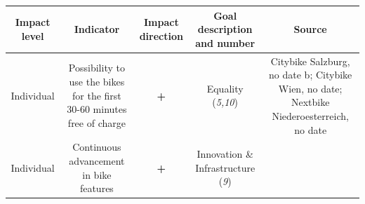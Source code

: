\documentclass[
]{book}
\begin{document}
\begin{longtable}[]{@{}ccccc@{}}
\toprule
\begin{minipage}[b]{0.17\columnwidth}\centering
Impact level\strut
\end{minipage} & \begin{minipage}[b]{0.16\columnwidth}\centering
Indicator\strut
\end{minipage} & \begin{minipage}[b]{0.17\columnwidth}\centering
Impact direction\strut
\end{minipage} & \begin{minipage}[b]{0.17\columnwidth}\centering
Goal description and number\strut
\end{minipage} & \begin{minipage}[b]{0.17\columnwidth}\centering
Source\strut
\end{minipage}\tabularnewline
\midrule
\endhead
\begin{minipage}[t]{0.17\columnwidth}\centering
Individual\strut
\end{minipage} & \begin{minipage}[t]{0.16\columnwidth}\centering
Possibility to use the bikes for the first 30-60 minutes free of charge\strut
\end{minipage} & \begin{minipage}[t]{0.17\columnwidth}\centering
\textbf{+}\strut
\end{minipage} & \begin{minipage}[t]{0.17\columnwidth}\centering
Equality (\emph{5,10})\strut
\end{minipage} & \begin{minipage}[t]{0.17\columnwidth}\centering
Citybike Salzburg, no date b; Citybike Wien, no date; Nextbike Niederoesterreich, no date\strut
\end{minipage}\tabularnewline
\begin{minipage}[t]{0.17\columnwidth}\centering
Individual\strut
\end{minipage} & \begin{minipage}[t]{0.16\columnwidth}\centering
Continuous advancement in bike features\strut
\end{minipage} & \begin{minipage}[t]{0.17\columnwidth}\centering
\textbf{+}\strut
\end{minipage} & \begin{minipage}[t]{0.17\columnwidth}\centering
Innovation \& Infrastructure (\emph{9})\strut
\end{minipage} & \begin{minipage}[t]{0.17\columnwidth}\centering

\end{minipage}
\end{longtable}
\end{document}
